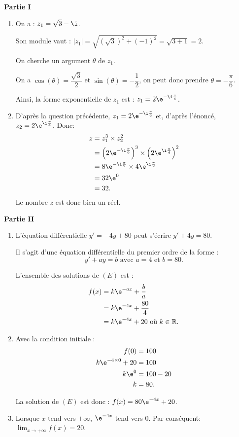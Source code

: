 \bigskip

\textbf{\large Partie I}

\medskip

\begin{enumerate}
\item  On a : $z_1 = \sqrt{3} - \i$.

Son module vaut : $|z_1|=\sqrt{(\sqrt{3})^2+(-1)^2}=\sqrt{3+1}=2$.

On cherche un argument $\theta$ de $z_1$.

On a $\cos(\theta)=\dfrac{\sqrt{3}}{2}$ et $\sin(\theta)=-\dfrac{1}{2}$, on peut donc prendre $\theta=-\dfrac{\pi}{6}$.

Ainsi, la forme exponentielle de $z_1$ est : $z_1=2\e^{-\i\frac{\pi}{6}}$.

\item D'après la question précédente, $z_1=2\e^{-\i\frac{\pi}{6}}$ et, d'après l'énoncé, $z_2=2\e^{\i\frac{\pi}{4}}$. Donc:
\[
\begin{aligned}
z&=z_1^3\times z_2^2\\
&=\left(2\e^{-\i\frac{\pi}{6}}\right)^3\times\left(2\e^{\i\frac{\pi}{4}}\right)^2\\
&=8\e^{-\i\frac{\pi}{2}}\times 4\e^{\i\frac{\pi}{2}}\\
&=32\e^0\\
&=32.
\end{aligned}
\]
Le nombre $z$ est donc bien un réel.
\end{enumerate}

\bigskip

\textbf{\large Partie II}

\medskip

\begin{enumerate}
\item  L'équation différentielle $y' = -4y + 80$ peut s'écrire $y' + 4y = 80$.
    
Il s'agit d'une équation différentielle du premier ordre de la forme :
\[y' + ay = b \text{ avec } a = 4 \text{ et } b = 80.\]

L'ensemble des solutions de $(E)$ est :
\begin{align*}
f(x) &= k\e^{-ax} + \dfrac{b}{a} \\
&= k\e^{-4x} + \dfrac{80}{4} \\
&= k\e^{-4x} + 20 \text{ où } k \in \mathbb{R}.
\end{align*}

\item Avec la condition initiale :
\begin{align*}
f(0) &= 100 \\
k\e^{-4\times0} + 20 &= 100 \\
k\e^0 &= 100 - 20 \\
k &= 80.
\end{align*}

La solution de $(E)$ est donc : $f(x) = 80\e^{-4x} + 20$.

\item Lorsque $x$ tend vers $+\infty$, $\e^{-4x}$ tend vers $0$. Par conséquent: $\displaystyle\lim_{x\to +\infty} f(x)=20$.
\end{enumerate}

\bigskip
